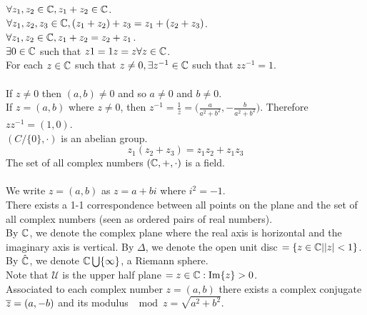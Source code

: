 \documentclass[12pt]{article}
\begin{document}
$\forall z_1,z_2 \in \mathbb{C}, z_1 + z_2 \in \mathbb{C}$. \\
$\forall z_1,z_2, z_3 \in \mathbb{C}, (z_1 + z_2) + z_3 = z_1 + (z_2 + z_3)$. \\
$\forall z_1,z_2 \in \mathbb{C}, z_1 + z_2 = z_2 + z_1$. \\
$\exists 0 \in \mathbb{C}$ such that $z1 = 1z = z \forall z \in \mathbb{C}$. \\
For each $z \in \mathbb{C}$ such that $z \neq 0, \exists z^{-1} \in \mathbb{C}$ such that $zz^{-1} = 1$. \\~\\
If $z \neq 0$ then $(a,b) \neq 0$ and so $a \neq 0$ and $b \neq 0$. \\ 
If $z = (a,b)$ where $z \neq 0$, then $z^{-1} = \frac{1}{z} = \Big( \frac{a}{a^2 + b^2}, -\frac{b}{a^2 + b^2} \Big)$. Therefore $zz^{-1} = (1,0)$. \\
$(C/\{0\}, \cdot)$ is an abelian group.  
$$z_1(z_2 + z_3) = z_1z_2 + z_1z_3$$
The set of all complex numbers $(\mathbb{C}, +,\cdot)$ is a field. \\~\\
We write $z = (a,b)$ as $z = a+bi$ where $i^2 = -1$. \\
There exists a 1-1 correspondence between all points on the plane and the set of all complex numbers (seen as ordered pairs of real numbers). \\
By $\mathbb{C}$, we denote the complex plane where the real axis is horizontal and the imaginary axis is vertical. By $\Delta$, we denote the open unit disc $= \{z \in \mathbb{C} | \abs{z} < 1\}$. By $\hat{\mathbb{C}}$, we denote $\mathbb{C} \bigcup \{\infty\}$, a Riemann sphere. \\ Note that $\mathcal{U}$ is the upper half plane $= z \in \mathbb{C} : \Im{z} > 0$. \\
Associated to each complex number $z = (a,b)$ there exists a complex conjugate $\overline{z} = (a,-b)$ and its modulus $\mod{z} = \sqrt{a^2 + b^2}$. \\~\\
\end{document}
